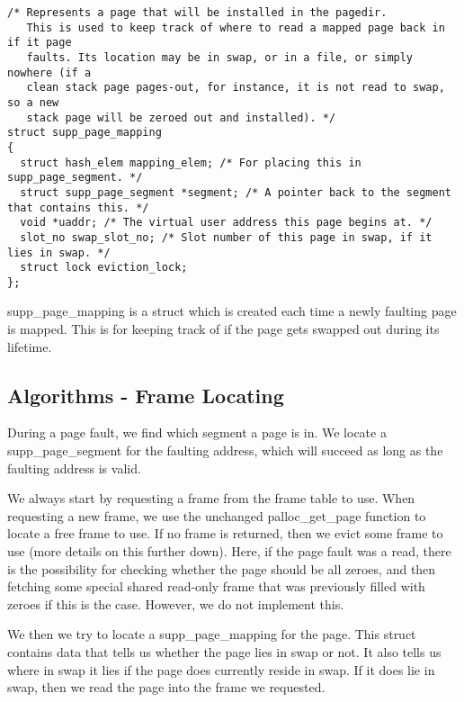 \begin{verbatim}
/* Represents a page that will be installed in the pagedir.
   This is used to keep track of where to read a mapped page back in if it page
   faults. Its location may be in swap, or in a file, or simply nowhere (if a
   clean stack page pages-out, for instance, it is not read to swap, so a new
   stack page will be zeroed out and installed). */
struct supp_page_mapping
{
  struct hash_elem mapping_elem; /* For placing this in supp_page_segment. */
  struct supp_page_segment *segment; /* A pointer back to the segment that contains this. */
  void *uaddr; /* The virtual user address this page begins at. */
  slot_no swap_slot_no; /* Slot number of this page in swap, if it lies in swap. */
  struct lock eviction_lock;
};
\end{verbatim}

supp\_page\_mapping is a struct which is created each time a newly faulting page
is mapped. This is for keeping track of if the page gets swapped out during its
lifetime.

\subsection{Algorithms - Frame Locating}


During a page fault, we find which segment a page is in. We locate a
supp\_page\_segment for the faulting address, which will succeed as long as the
faulting address is valid.

We always start by requesting a frame from the frame table to use.  When
requesting a new frame, we use the unchanged palloc\_get\_page function to
locate a free frame to use. If no frame is returned, then we evict some frame to
use (more details on this further down). Here, if the page fault was a read,
there is the possibility for checking whether the page should be all zeroes, and
then fetching some special shared read-only frame that was previously filled
with zeroes if this is the case.  However, we do not implement this.

We then we try to locate a supp\_page\_mapping for the page. This struct
contains data that tells us whether the page lies in swap or not. It also tells
us where in swap it lies if the page does currently reside in swap. If it does
lie in swap, then we read the page into the frame we requested.

